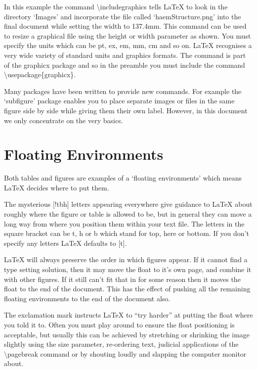 In this example the command {\textbackslash}includegraphics tells LaTeX to look in the directory `Images' and incorporate the file called `haemStructure.png' into the final document while setting the width to 137.4mm.  This command can be used to resize a graphical file using the height or width parameter as shown. You must specify the units which can be pt, ex, em, mm, cm and so on. LaTeX recognises a very wide variety of standard units and graphics formats. The command is part of the graphicx package and so in the preamble you must include the command {\textbackslash}usepackage\{graphicx\}.

Many packages have been written to provide new commands. For example the `subfigure' package enables you to place separate images or files in the same figure side by side while giving them their own label. However, in this document we only concentrate on the very basics.

\section{Floating Environments}

Both tables and figures are examples of a `floating environments' which means LaTeX decides where to put them. 

The mysterious [!tbh] letters appearing everywhere give guidance to LaTeX about roughly where the figure or table is  allowed to be, but in general they can move a long way from where you position them within your text file.  The letters in the square bracket can be t, h or b which stand for top, here or bottom.  If you don't specify any letters LaTeX defaults to [t].

LaTeX will always preserve the order in which figures appear.  If it cannot find a type setting solution, then it may move the float to it's own page, and combine it with other figures. If it still can't fit that in for some reason then it moves the float to the end of the document.  This has the effect of pushing all the remaining floating environments to the end of the document also.

The exclamation mark instructs LaTeX to ``try harder'' at putting the float where you told it to. Often you must play around to ensure the float positioning is acceptable, but usually this can be achieved by stretching or shrinking the image slightly using the size parameter, re-ordering text, judicial applications of the {\textbackslash}pagebreak command or by shouting loudly and slapping the computer monitor about.